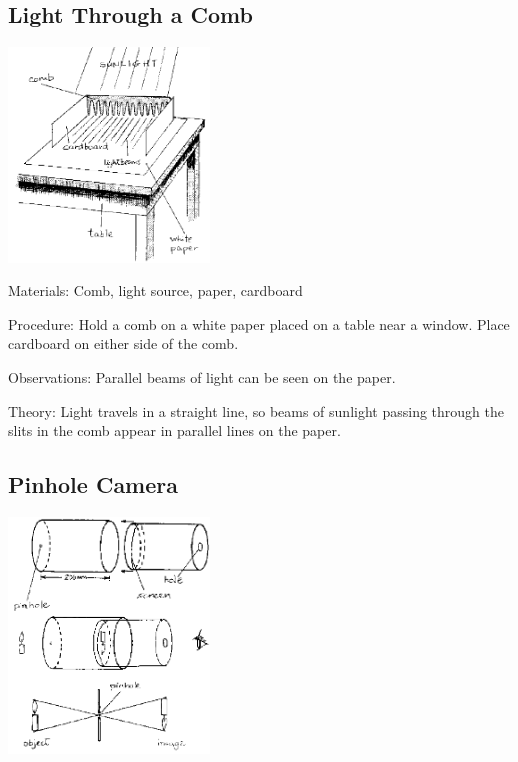 \begin{multicols}{2}
\subsection{Light Through a Comb}

\begin{center}
\includegraphics[width=0.4\textwidth]{./img/source/light-comb.png}
\end{center}

\begin{description*}
\item[Materials:]{Comb, light source, paper, cardboard}
\item[Procedure:]{Hold a comb on a white paper placed on a table near a window. Place cardboard on either side of the comb.}
\item[Observations:]{Parallel beams of light can be seen on the paper.}
\item[Theory:]{Light travels in a straight line, so beams of sunlight passing through the slits in the comb appear in parallel lines on the paper.}
\end{description*}

\subsection{Pinhole Camera}

\begin{center}
\includegraphics[width=0.4\textwidth]{./img/source/pinhole-camera.png}
\end{center}


\end{multicols}
